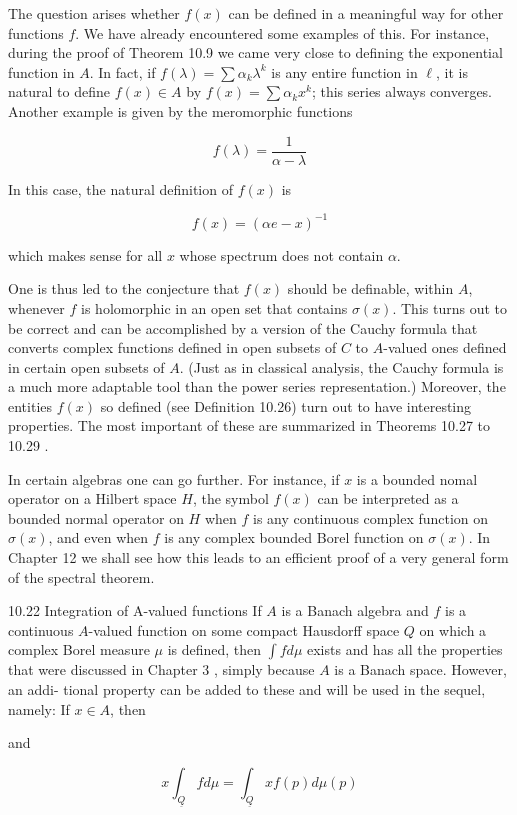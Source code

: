 \documentclass[10pt]{article}
\begin{document}
The question arises whether $f(x)$ can be defined in a meaningful way for other functions $f$. We have already encountered some examples of this. For instance, during the proof of Theorem 10.9 we came very close to defining the exponential function in $A$. In fact, if $f(\lambda)=\sum \alpha_{k} \lambda^{k}$ is any entire function in $\ell$, it is natural to define $f(x) \in A$ by $f(x)=\sum \alpha_{k} x^{k}$; this series always converges. Another example is given by the meromorphic functions

$$
f(\lambda)=\frac{1}{\alpha-\lambda}
$$

In this case, the natural definition of $f(x)$ is

$$
f(x)=(\alpha e-x)^{-1}
$$

which makes sense for all $x$ whose spectrum does not contain $\alpha$.

One is thus led to the conjecture that $f(x)$ should be definable, within $A$, whenever $f$ is holomorphic in an open set that contains $\sigma(x)$. This turns out to be correct and can be accomplished by a version of the Cauchy formula that converts complex functions defined in open subsets of $C$ to $A$-valued ones defined in certain open subsets of $A$. (Just as in classical analysis, the Cauchy formula is a much more adaptable tool than the power series representation.) Moreover, the entities $f(x)$ so defined (see Definition 10.26) turn out to have interesting properties. The most important of these are summarized in Theorems 10.27 to 10.29 .

In certain algebras one can go further. For instance, if $x$ is a bounded nomal operator on a Hilbert space $H$, the symbol $f(x)$ can be interpreted as a bounded normal operator on $H$ when $f$ is any continuous complex function on $\sigma(x)$, and even when $f$ is any complex bounded Borel function on $\sigma(x)$. In Chapter 12 we shall see how this leads to an efficient proof of a very general form of the spectral theorem.

10.22 Integration of A-valued functions If $A$ is a Banach algebra and $f$ is a continuous $A$-valued function on some compact Hausdorff space $Q$ on which a complex Borel measure $\mu$ is defined, then $\int f d \mu$ exists and has all the properties that were discussed in Chapter 3 , simply because $A$ is a Banach space. However, an addi-
tional property can be added to these and will be used in the sequel, namely: If $x \in A$,
then

and

$$
x \int_{\underline{Q}} f d \mu=\int_{\underline{Q}} x f(p) d \mu(p)
$$
\end{document}
